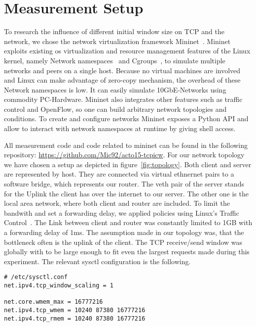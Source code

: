 \section{Measurement Setup}
\label{sec:measurement_setup}

To research the influence of different initial window size on TCP and the
network, we chose the network virtualization framework Mininet~\cite{mininet}.
Mininet exploits existing os virtualization and resource management features of
the Linux kernel, namely Network namespaces~\cite{network_namespaces} and
Cgroups~\cite{cgroups}, to simulate multiple networks and peers on a single
host. Because no virtual machines are involved and Linux can make advantage of
zero-copy mechanism, the overhead of these Network namespaces is low. It can
easily simulate 10GbE-Networks using commodity PC-Hardware. Mininet also
integrates other features such as traffic control and OpenFlow, so one can build
arbitrary network topologies and conditions. To create and configure networks
Mininet exposes a Python API and allow to interact with network namespaces at
runtime by giving shell access.



All measurement code and code related to mininet can be found in the following
repository: \url{https://github.com/Mic92/acto15-tcpicw}. For our network
topology we have chosen a setup as depicted in figure~\ref{fig:topology}. Both
client and server are represented by host. They are connected via virtual
ethnernet pairs to a software bridge, which represents our router. The veth pair
of the server stands for the Uplink the client has over the internet to our
server. The other one is the local area network, where both client and router
are included. To limit the bandwith and set a forwarding delay, we applied
policies using Linux's Traffic Control~\cite{tc}. The Link between client and
router was constantly limited to 1GB with a forwarding delay of 1ms. The
assumption made in our topology was, that the bottleneck often is the uplink of
the client. The TCP receive/send window was globally with to be large enough to
fit even the largest requests made during this experiment. The relevant sysctl
configuration is the following.

\begin{lstlisting}
# /etc/sysctl.conf
net.ipv4.tcp_window_scaling = 1

net.core.wmem_max = 16777216
net.ipv4.tcp_wmem = 10240 87380 16777216
net.ipv4.tcp_rmem = 10240 87380 16777216
\end{lstlisting}


